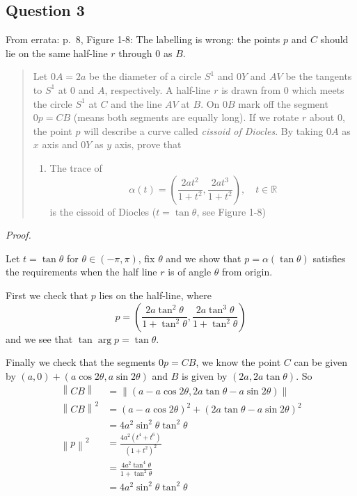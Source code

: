 \documentclass[12pt]{article}
\begin{document}
\subsection*{Question 3}

From errata: p.~8, Figure 1-8: The labelling is wrong: the points \(p\)
and \(C\) should lie on the same half-line \(r\) through \(0\) as \(B\).

\begin{quote}
Let \(0A = 2a\) be the diameter of a circle \(S^1\) and \(0Y\) and
\(AV\) be the tangents to \(S^1\) at \(0\) and \(A\), respectively. A
half-line \(r\) is drawn from \(0\) which meets the circle \(S^1\) at
\(C\) and the line \(AV\) at \(B\). On \(0B\) mark off the segment
\(0p = CB\) (means both segments are equally long). If we rotate \(r\)
about \(0\), the point \(p\) will describe a curve called \emph{cissoid
of Diocles}. By taking \(0A\) as \(x\) axis and \(0Y\) as \(y\) axis,
prove that

\begin{enumerate}
\def\labelenumi{\alph{enumi}.}
\tightlist
\item
  The trace of
  \[ \alpha(t) = \left( \frac{2at^2}{1+t^2}, \frac{2at^3}{1+t^2} \right) ,\quad t\in\mathbb{R} \]
  is the cissoid of Diocles (\(t = \tan\theta\), see Figure 1-8)
\end{enumerate}
\end{quote}

\emph{Proof.}

Let \(t = \tan\theta\) for \(\theta \in (-\pi,\pi)\), fix \(\theta\) and
we show that \(p = \alpha(\tan\theta)\) satisfies the requirements when
the half line \(r\) is of angle \(\theta\) from origin.

First we check that \(p\) lies on the half-line, where
\[ p = \left( \frac{2a\tan^2\theta}{1+\tan^2\theta}, \frac{2a\tan^3\theta}{1+\tan^2\theta} \right) \]
and we see that \(\tan\arg p = \tan\theta\).

Finally we check that the segments \(0p = CB\), we know the point \(C\)
can be given by \((a,0) + (a \cos 2\theta, a \sin 2\theta)\) and \(B\)
is given by \((2a, 2a\tan\theta )\). So \begin{align*}
\left\lVert CB \right\rVert &= \left\lVert \left(  a - a\cos 2\theta, 2a\tan\theta - a\sin 2\theta  \right) \right\rVert \\
\left\lVert CB \right\rVert^2 &=
(a - a\cos2\theta)^2 + (2a\tan\theta - a\sin2\theta)^2 \\
&= 4a^2\sin^2\theta\tan^2\theta \\
\left\lVert p \right\rVert^2 &= \frac{4a^2(t^4 + t^6)}{(1+t^2)^2} \\
&= \frac{4a^2 \tan^4\theta}{1+\tan^2\theta} \\
&= 4a^2\sin^2\theta\tan^2\theta
\end{align*}
\end{document}
